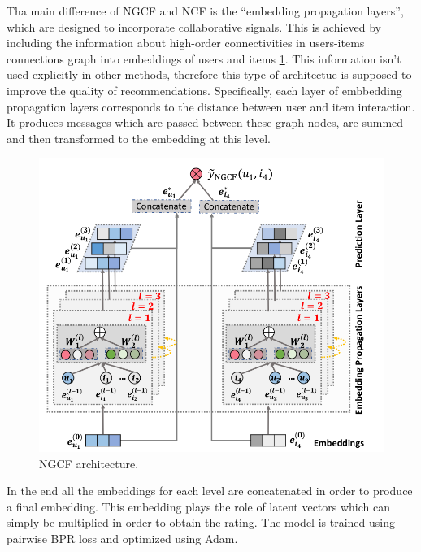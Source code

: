 
Tha main difference of NGCF \cite{wang2019neural} and NCF is the ``embedding propagation layers'', which are 
designed to incorporate collaborative signals.
This is achieved by including the information about high-order connectivities 
in users-items connections graph into embeddings of users and items \ref{fig:ngcf}.
This information isn't used explicitly in other methods, therefore this type 
of architectue is supposed to improve the quality of recommendations.
Specifically, each layer of embbedding propagation layers corresponds 
to the distance between user and item interaction. It produces messages which 
are passed between these graph nodes, are summed and then transformed to the 
embedding at this level.
\begin{figure}[h]
    \centering
    \includegraphics[width=0.8\linewidth]{images/ngcf.png}
    \caption{NGCF architecture.}
    \label{fig:ngcf}
\end{figure}
In the end all the embeddings for each level are concatenated in order to produce a final embedding.
This embedding plays the role of latent vectors which can simply be multiplied in order to obtain the rating.
The model is trained using pairwise BPR loss and optimized using Adam.